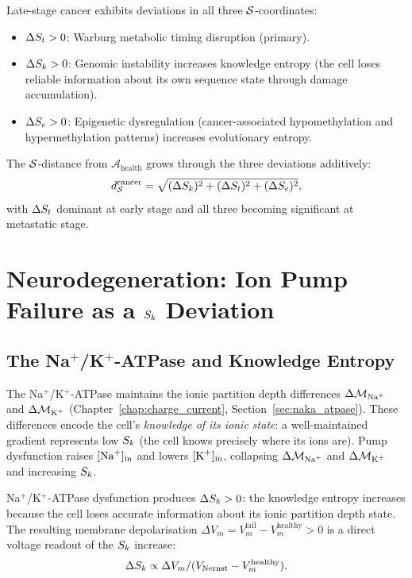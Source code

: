 Late-stage cancer exhibits deviations in all three $\mathcal{S}$-coordinates:
\begin{itemize}
  \item $\Delta S_t > 0$: Warburg metabolic timing disruption (primary).
  \item $\Delta S_k > 0$: Genomic instability increases knowledge entropy
        (the cell loses reliable information about its own sequence state
        through  damage accumulation).
  \item $\Delta S_e > 0$: Epigenetic dysregulation (cancer-associated
        hypomethylation and hypermethylation patterns) increases evolutionary
        entropy.
\end{itemize}
The $\mathcal{S}$-distance from $\mathcal{A}_{\mathrm{health}}$ grows through the
three deviations additively:
\begin{equation}
  d_{\mathcal{S}}^{\mathrm{cancer}}
    = \sqrt{(\Delta S_k)^2 + (\Delta S_t)^2 + (\Delta S_e)^2},
\end{equation}
with $\Delta S_t$ dominant at early stage and all three becoming significant at
metastatic stage.

\section{Neurodegeneration: Ion Pump Failure as a \texorpdfstring{$S_k$}{Sk} Deviation}
\label{sec:neurodegeneration}

\subsection{The Na\texorpdfstring{$^+$}{+}/K\texorpdfstring{$^+$}{+}-ATPase and Knowledge Entropy}
\label{ssec:naka_knowledge}

The Na$^+$/K$^+$-ATPase maintains the ionic partition depth differences
$\Delta\Depth_{\ce{Na+}}$ and $\Delta\Depth_{\ce{K+}}$ (Chapter~\ref{chap:charge_current},
Section~\ref{sec:naka_atpase}). These differences encode the cell's
\emph{knowledge of its ionic state}: a well-maintained gradient represents
low $S_k$ (the cell knows precisely where its ions are). Pump dysfunction
raises $[\ce{Na+}]_{\mathrm{in}}$ and lowers $[\ce{K+}]_{\mathrm{in}}$,
collapsing $\Delta\Depth_{\ce{Na+}}$ and $\Delta\Depth_{\ce{K+}}$ and
increasing $S_k$.

\begin{proposition}
\label{prop:pump_failure_sk}
Na$^+$/K$^+$-ATPase dysfunction produces $\Delta S_k > 0$: the knowledge
entropy increases because the cell loses accurate information about its
ionic partition depth state. The resulting membrane depolarisation
$\Delta V_m = V_m^{\mathrm{fail}} - V_m^{\mathrm{healthy}} > 0$ is
a direct voltage readout of the $S_k$ increase:
\begin{equation}
  \Delta S_k \propto \Delta V_m / (V_{\mathrm{Nernst}} - V_m^{\mathrm{healthy}}).
  \label{eq:sk_depolarization}
\end{equation}
\end{proposition}

